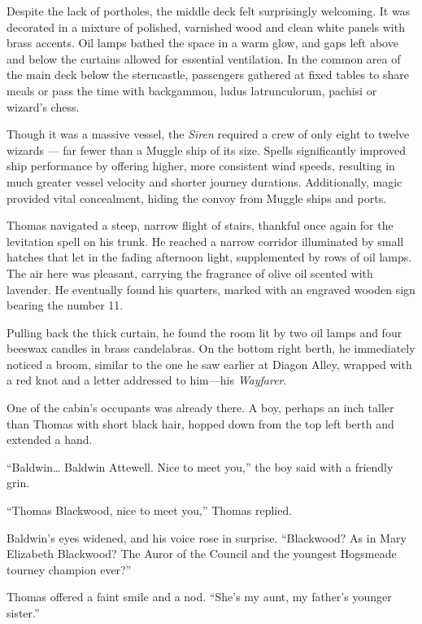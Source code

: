 Despite the lack of portholes, the middle deck felt surprisingly welcoming. It was decorated in a mixture of polished, varnished wood and clean white panels with brass accents. Oil lamps bathed the space in a warm glow, and gaps left above and below the curtains allowed for essential ventilation. In the common area of the main deck below the sterncastle, passengers gathered at fixed tables to share meals or pass the time with backgammon, ludus latrunculorum, pachisi or wizard's chess.

Though it was a massive vessel, the \textit{Siren} required a crew of only eight to twelve wizards --- far fewer than a Muggle ship of its size. Spells significantly improved ship performance by offering higher, more consistent wind speeds, resulting in much greater vessel velocity and shorter journey durations. Additionally, magic provided vital concealment, hiding the convoy from Muggle ships and ports.

Thomas navigated a steep, narrow flight of stairs, thankful once again for the levitation spell on his trunk. He reached a narrow corridor illuminated by small hatches that let in the fading afternoon light, supplemented by rows of oil lamps. The air here was pleasant, carrying the fragrance of olive oil scented with lavender. He eventually found his quarters, marked with an engraved wooden sign bearing the number 11.

Pulling back the thick curtain, he found the room lit by two oil lamps and four beeswax candles in brass candelabras. On the bottom right berth, he immediately noticed a broom, similar to the one he saw earlier at Diagon Alley, wrapped with a red knot and a letter addressed to him---his \textit{Wayfarer}.

One of the cabin's occupants was already there. A boy, perhaps an inch taller than Thomas with short black hair, hopped down from the top left berth and extended a hand.

\enquote{Baldwin\ldots{} Baldwin Attewell. Nice to meet you,} the boy said with a friendly grin.

\enquote{Thomas Blackwood, nice to meet you,} Thomas replied.

Baldwin's eyes widened, and his voice rose in surprise. \enquote{Blackwood? As in Mary Elizabeth Blackwood? The Auror of the Council and the youngest Hogsmeade tourney champion ever?}

Thomas offered a faint smile and a nod. \enquote{She's my aunt, my father's younger sister.}

